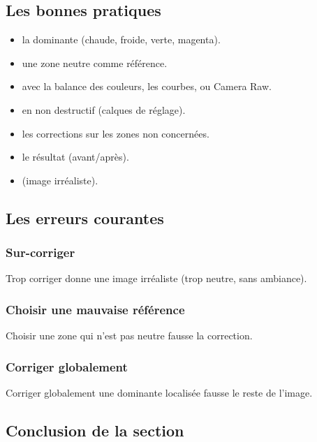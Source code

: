\subsection{Les bonnes pratiques}

\begin{itemize}
    \item {} la dominante (chaude, froide, verte, magenta).
    \item {} une zone neutre comme référence.
    \item {} avec la balance des couleurs, les courbes, ou Camera Raw.
    \item {} en non destructif (calques de réglage).
    \item {} les corrections sur les zones non concernées.
    \item {} le résultat (avant/après).
    \item {} (image irréaliste).
\end{itemize}

\subsection{Les erreurs courantes}

\subsubsection{Sur-corriger}

Trop corriger donne une image irréaliste (trop neutre, sans ambiance).

\subsubsection{Choisir une mauvaise référence}

Choisir une zone qui n'est pas neutre fausse la correction.

\subsubsection{Corriger globalement}

Corriger globalement une dominante localisée fausse le reste de l'image.

\subsection*{Conclusion de la section}

